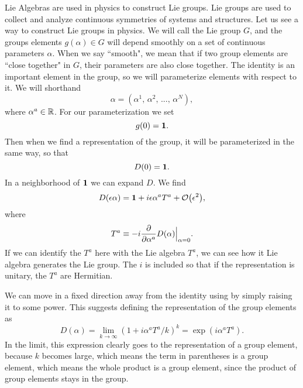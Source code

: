 Lie Algebras are used in physics to construct Lie groups.
Lie groups are used to collect and analyze continuous symmetries of systems
and structures.
Let us see a way to construct Lie groups in physics. We will call the 
Lie group $G$, and the groups elements $g(\alpha)\in G$ will depend
smoothly on a set of continuous parameters $\alpha$. When we say ``smooth", we
mean that if two group elements are ``close together" in $G$, their parameters
are also close together. The identity is an important element in the group, so
we will parameterize elements with respect to it. We will shorthand
\begin{equation}
  \alpha=\left(\alpha^1,\,\alpha^2,\,...,\,\alpha^N\right),
\end{equation}
where $\alpha^a\in\mathbb{R}$. For our parameterization we set
\begin{equation}
  g(0)={\mathbf 1}.
\end{equation}
Then when we find a representation of the group, it will be
parameterized in the same way, so that
\begin{equation}
  D(0)={\mathbf 1}.
\end{equation}
In a neighborhood of ${\mathbf 1}$ we can expand $D$. We find
\begin{equation}\label{eq:Depsilon}
  D(\epsilon\alpha)=\id+i\epsilon\alpha^aT^a+\order{\epsilon^2},
\end{equation}
where
\begin{equation}
  T^a\equiv-i\pdv{\alpha^a}D(\alpha)\Big|_{\alpha=0}.
\end{equation}
If we can identify the $T^a$ here with the Lie algebra $T^a$, we can see
how it Lie algebra generates the Lie group. The $i$ is included so that
if the representation is unitary, the $T^a$ are Hermitian.

We can move in a fixed direction away from the identity using
 by simply raising it to some power. This suggests
defining the representation of the group elements as
\begin{equation}
  D(\alpha)=\lim_{k\to\infty}\left(1+i\alpha^aT^a/k\right)^k
           =\exp(i\alpha^aT^a).
\end{equation}
In the limit, this expression clearly goes to the representation of a group 
element, because $k$ becomes large, which means the term in parentheses is a 
group element, which means the whole product is a group element, since the
product of group elements stays in the group.


